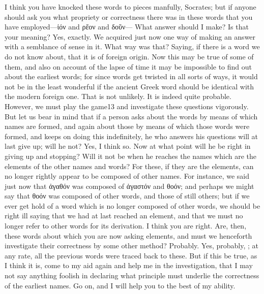 {{{{{\hermogenesspeaks
I think you have knocked these words to pieces manfully, Socrates; but if anyone should ask you what propriety or correctness there was in these words that you have employed—ἰόν and ρἕον and δοῦν—
\socratesspeaks
What answer should I make? Is that your meaning?
\hermogenesspeaks
Yes, exactly.
\socratesspeaks
We acquired just now one way of making an answer with a semblance of sense in it.
\hermogenesspeaks
What way was that?
\socratesspeaks
Saying, if there is a word we do not know about, that it is of foreign origin.  Now this may be true of some of them, and also on account of the lapse of time it may be impossible to find out about the earliest words; for since words get twisted in all sorts of ways, it would not be in the least wonderful if the ancient Greek word should be identical with the modern foreign one.
\hermogenesspeaks
That is not unlikely.
\socratesspeaks
It is indeed quite probable. However, we must play the game13 and investigate these questions vigorously. But let us bear in mind that if a person asks  about the words by means of which names are formed, and again about those by means of which those words were formed, and keeps on doing this indefinitely, he who answers his questions will at last give up; will he not?
\hermogenesspeaks
Yes, I think so. 
\socratesspeaks
Now at what point will he be right in giving up and stopping? Will it not be when he reaches the names which are the elements of the other names and words? For these, if they are the elements, can no longer rightly appear to be composed of other names. For instance, we said just now that ἀγαθόν was composed of ἀγαστόν and θοόν; and perhaps we might say that θοόν was composed of other words, and those of still others;  but if we ever get hold of a word which is no longer composed of other words, we should be right ill saying that we had at last reached an element, and that we must no longer refer to other words for its derivation.
\hermogenesspeaks
I think you are right.
\socratesspeaks
Are, then, these words about which you are now asking elements, and must we henceforth investigate their correctness by some other method?
\hermogenesspeaks
Probably.
\socratesspeaks
Yes, probably, \hermogenesspeaks; at any rate, all the previous words were traced back to these.  But if this be true, as I think it is, come to my aid again and help me in the investigation, that I may not say anything foolish in declaring what principle must underlie the correctness of the earliest names.
\hermogenesspeaks
Go on, and I will help you to the best of my ability.
}}}}}

